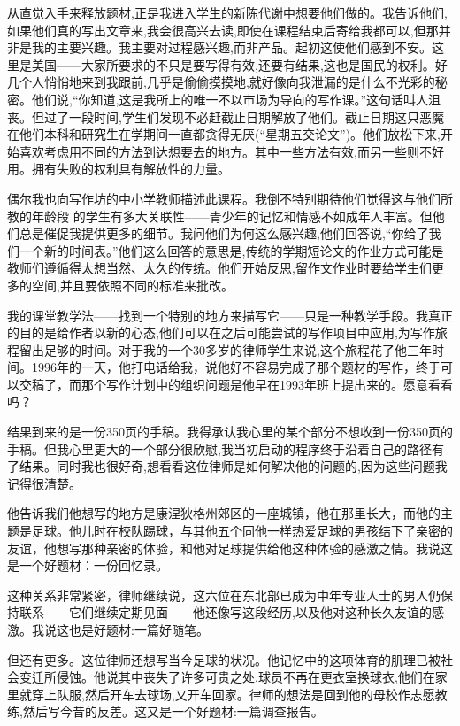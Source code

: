 从直觉入手来释放题材,正是我进入学生的新陈代谢中想要他们做的。我告诉他们,如果他们真的写出文章来,我会很高兴去读,即使在课程结束后寄给我都可以,但那并非是我的主要兴趣。我主要对过程感兴趣,而非产品。起初这使他们感到不安。这里是美国——大家所要求的不只是要写得有效,还要有结果,这也是国民的权利。好几个人悄悄地来到我跟前,几乎是偷偷摸摸地,就好像向我泄漏的是什么不光彩的秘密。他们说,“你知道,这是我所上的唯一不以市场为导向的写作课。”这句话叫人沮丧。但过了一段时间,学生们发现不必赶截止日期解放了他们。截止日期这只恶魔在他们本科和研究生在学期间一直都贪得无厌(“星期五交论文”)。他们放松下来,开始喜欢考虑用不同的方法到达想要去的地方。其中一些方法有效,而另一些则不好用。拥有失败的权利具有解放性的力量。

偶尔我也向写作坊的中小学教师描述此课程。我倒不特别期待他们觉得这与他们所教的年龄段 的学生有多大关联性——青少年的记忆和情感不如成年人丰富。但他们总是催促我提供更多的细节。我问他们为何这么感兴趣,他们回答说,“你给了我们一个新的时间表。”他们这么回答的意思是,传统的学期短论文的作业方式可能是教师们遵循得太想当然、太久的传统。他们开始反思,留作文作业时要给学生们更多的空间,并且要依照不同的标准来批改。

我的课堂教学法——找到一个特别的地方来描写它——只是一种教学手段。我真正的目的是给作者以新的心态,他们可以在之后可能尝试的写作项目中应用,为写作旅程留出足够的时间。对于我的一个30多岁的律师学生来说,这个旅程花了他三年时间。1996年的一天，他打电话给我，说他好不容易完成了那个题材的写作，终于可以交稿了，而那个写作计划中的组织问题是他早在1993年班上提出来的。愿意看看吗？

结果到来的是一份350页的手稿。我得承认我心里的某个部分不想收到一份350页的手稿。但我心里更大的一个部分很欣慰,我当初启动的程序终于沿着自己的路径有了结果。同时我也很好奇,想看看这位律师是如何解决他的问题的,因为这些问题我记得很清楚。


他告诉我们他想写的地方是康涅狄格州郊区的一座城镇，他在那里长大，而他的主题是足球。他儿时在校队踢球，与其他五个同他一样热爱足球的男孩结下了亲密的友谊，他想写那种亲密的体验，和他对足球提供给他这种体验的感激之情。我说这是一个好题材：一份回忆录。

这种关系非常紧密，律师继续说，这六位在东北部已成为中年专业人士的男人仍保持联系——它们继续定期见面——他还像写这段经历,以及他对这种长久友谊的感激。我说这也是好题材:一篇好随笔。

但还有更多。这位律师还想写当今足球的状况。他记忆中的这项体育的肌理已被社会变迁所侵蚀。他说其中丧失了许多可贵之处,球员不再在更衣室换球衣,他们在家里就穿上队服,然后开车去球场,又开车回家。律师的想法是回到他的母校作志愿教练,然后写今昔的反差。这又是一个好题材:一篇调查报告。


